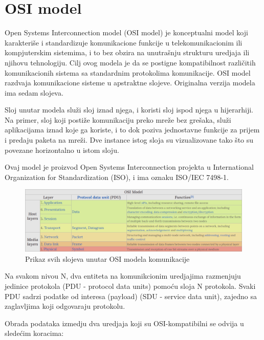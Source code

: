 \documentclass[a4paper,12pt, master]{etf}
\begin{document}
	\section{OSI model}

	Open Systems Interconnection model (OSI model) je konceptualni model koji 
	karakteri\v{s}e i standardizuje komunikacione funkcije u telekomunikacionim 
	ili kompjuterskim sistemima, i to bez obzira na unutra\v{s}nju strukturu 
	uredjaja ili njihovu tehnologiju. Cilj ovog modela je da se postigne 
	kompatibilnost razli\v{c}itih komunikacionih sistema sa standardnim
	protokolima komunikacije. OSI model razdvaja komunikacione sisteme u 
	apstraktne slojeve.	Originalna verzija modela ima sedam slojeva.

	Sloj unutar modela slu\v{z}i sloj iznad njega, i koristi sloj ispod njega u 
	hijerarhiji. Na	primer, sloj koji posti\v{z}e komunikaciju preko mre\v{z}e 
	bez gre\v{s}aka, slu\v{z}i aplikacijama iznad koje ga koriste, i to dok 
	poziva jednostavne funkcije za prijem i predaju paketa na mre\v{z}i.
	Dve instance istog sloja su vizualizovane tako \v{s}to su povezane 
	horizontalno u istom sloju.

	Ovaj model je proizvod Open Systems Interconnection projekta u 
	International Organization for Standardization (ISO), i ima oznaku ISO/IEC 
	7498-1.

	\begin{figure}[htb]
			\centering
			\includegraphics[scale=.43]{../pic/osi_model.png}
			\caption{Prikaz svih slojeva unutar OSI modela komunikacije}
			\label{fig:osi_model}
	\end{figure}

	Na svakom nivou N, dva entiteta na komunikcionim uredjajima razmenjuju 
	jedinice protokola (PDU - protocol data units) pomo\'{c}u sloja N 
	protokola. Svaki PDU sadrzi podatke od interesa	(payload) (SDU - service 
	data unit), zajedno sa zaglavljima koji odgovaraju protokolu.

	Obrada podataka izmedju dva uredjaja koji su OSI-kompatibilni se odvija u 
	slede\'{c}im koracima:
	
\end{document}
